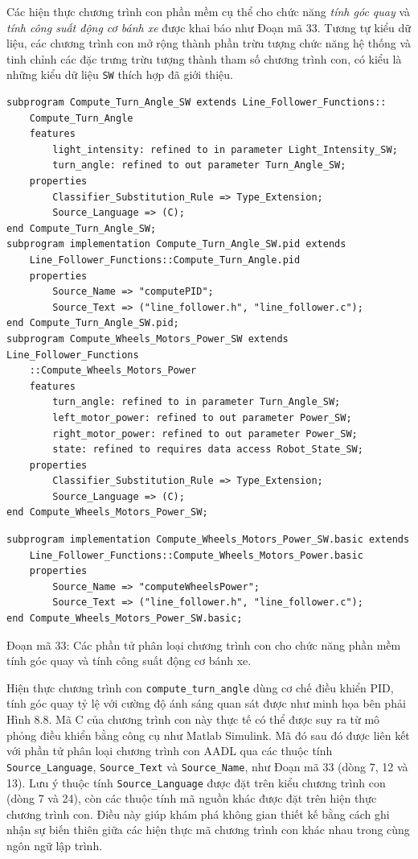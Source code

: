 Các hiện thực chương trình con phần mềm cụ thể cho chức năng \emph{tính góc quay} và \emph{tính công suất động cơ bánh xe} được khai báo như Đoạn mã 33. Tương tự kiểu dữ liệu, các chương trình con mở rộng thành phần trừu tượng chức năng hệ thống và tinh chỉnh các đặc trưng trừu tượng thành tham số chương trình con, có kiểu là những kiểu dữ liệu \texttt{SW} thích hợp đã giới thiệu.
\begin{verbatim}
subprogram Compute_Turn_Angle_SW extends Line_Follower_Functions::
    Compute_Turn_Angle
    features
        light_intensity: refined to in parameter Light_Intensity_SW;
        turn_angle: refined to out parameter Turn_Angle_SW;
    properties
        Classifier_Substitution_Rule => Type_Extension;
        Source_Language => (C);
end Compute_Turn_Angle_SW;
subprogram implementation Compute_Turn_Angle_SW.pid extends
    Line_Follower_Functions::Compute_Turn_Angle.pid
    properties
        Source_Name => "computePID";
        Source_Text => ("line_follower.h", "line_follower.c");
end Compute_Turn_Angle_SW.pid;
subprogram Compute_Wheels_Motors_Power_SW extends Line_Follower_Functions
    ::Compute_Wheels_Motors_Power
    features
        turn_angle: refined to in parameter Turn_Angle_SW;
        left_motor_power: refined to out parameter Power_SW;
        right_motor_power: refined to out parameter Power_SW;
        state: refined to requires data access Robot_State_SW;
    properties
        Classifier_Substitution_Rule => Type_Extension;
        Source_Language => (C);
end Compute_Wheels_Motors_Power_SW;
\end{verbatim}

\begin{verbatim}
subprogram implementation Compute_Wheels_Motors_Power_SW.basic extends
    Line_Follower_Functions::Compute_Wheels_Motors_Power.basic
    properties
        Source_Name => "computeWheelsPower";
        Source_Text => ("line_follower.h", "line_follower.c");
end Compute_Wheels_Motors_Power_SW.basic;
\end{verbatim}
\begin{center}\small Đoạn mã 33: Các phần tử phân loại chương trình con cho chức năng phần mềm tính góc quay và tính công suất động cơ bánh xe.\end{center}

Hiện thực chương trình con \texttt{compute\_turn\_angle} dùng cơ chế điều khiển PID, tính góc quay tỷ lệ với cường độ ánh sáng quan sát được như minh họa bên phải Hình 8.8. Mã C của chương trình con này thực tế có thể được suy ra từ mô phỏng điều khiển bằng công cụ như Matlab Simulink. Mã đó sau đó được liên kết với phần tử phân loại chương trình con AADL qua các thuộc tính \texttt{Source\_Language}, \texttt{Source\_Text} và \texttt{Source\_Name}, như Đoạn mã 33 (dòng 7, 12 và 13). Lưu ý thuộc tính \texttt{Source\_Language} được đặt trên kiểu chương trình con (dòng 7 và 24), còn các thuộc tính mã nguồn khác được đặt trên hiện thực chương trình con. Điều này giúp khám phá không gian thiết kế bằng cách ghi nhận sự biến thiên giữa các hiện thực mã chương trình con khác nhau trong cùng ngôn ngữ lập trình.

